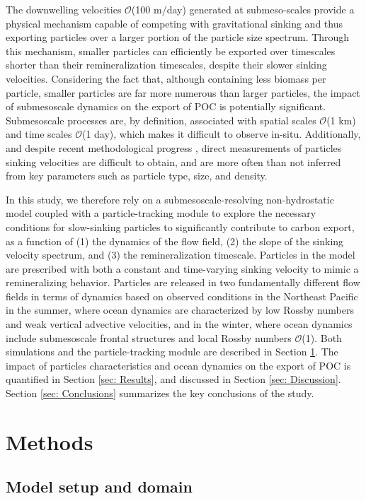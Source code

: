\documentclass[draft,linenumbers]{agujournal2018}
\begin{document}
The downwelling velocities $\mathcal{O}$(100 m/day) generated at submeso-scales provide a physical mechanism capable of competing with gravitational sinking and thus exporting particles over a larger portion of the particle size spectrum. Through this mechanism, smaller particles can efficiently be exported over timescales shorter than their remineralization timescales, despite their slower sinking velocities. Considering the fact that, although containing less biomass per particle, smaller particles are far more numerous than larger particles, the impact of submesoscale dynamics on the export of POC is potentially significant. Submesoscale processes are, by definition, associated with spatial scales $\mathcal{O}$(1 km) and time scales $\mathcal{O}$(1 day), which makes it difficult to observe in-situ. Additionally, and despite recent methodological progress \citep{McDonnell_2010}, direct measurements of particles sinking velocities are difficult to obtain, and are more often than not inferred from key parameters such as particle type, size, and density.

In this study, we therefore rely on a submesoscale-resolving non-hydrostatic model coupled with a particle-tracking module to explore the necessary conditions for slow-sinking particles to significantly contribute to carbon export, as a function of (1) the dynamics of the flow field, (2) the slope of the sinking velocity spectrum, and (3) the remineralization timescale. Particles in the model are prescribed with both a constant and time-varying sinking velocity to mimic a remineralizing behavior. Particles are released in two fundamentally different flow fields in terms of dynamics based on observed conditions in the Northeast Pacific in the summer, where ocean dynamics are characterized by low Rossby numbers and weak vertical advective velocities, and in the winter, where ocean dynamics include submesoscale frontal structures and local Rossby numbers $\mathcal{O}$(1). Both simulations and the particle-tracking module are described in Section \ref{sec: Methods}. The impact of particles characteristics and ocean dynamics on the export of POC is quantified in Section \ref{sec: Results}, and discussed in Section \ref{sec: Discussion}. Section \ref{sec: Conclusions} summarizes the key conclusions of the study.

\section{Methods}
\label{sec: Methods}
\subsection{Model setup and domain}
\end{document}
